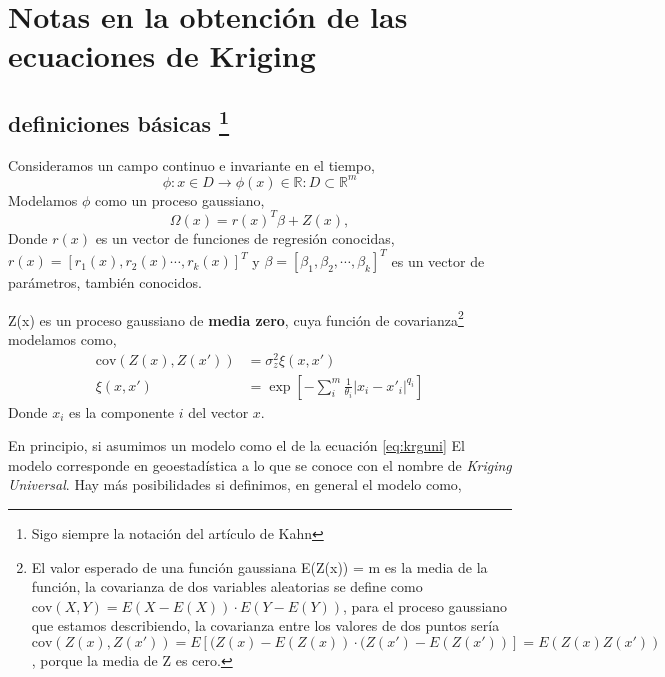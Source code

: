 \documentclass[10pt,a4paper]{report}
\begin{document}
\section{Notas en la obtención de las ecuaciones de Kriging}

\subsection{definiciones básicas \protect\footnote{Sigo siempre la notación del artículo de Kahn}}
Consideramos un campo continuo e invariante en el tiempo,
\begin{equation*}
\phi:x\in D \rightarrow \phi(x) \in \mathbb{R}: D \subset \mathbb{R}^m
\end{equation*}
Modelamos $\phi$ como un proceso gaussiano,
\begin{equation}\label{eq:krguni}
\Omega(x) = r(x)^T\beta+ Z(x),
\end{equation}
Donde $r(x)$ es un vector de funciones de regresión conocidas,\\
$r(x) = [r_1(x),r_2(x)\cdots, r_k(x)]^T$ y $\beta =[\beta_1,\beta_2,\cdots, \beta_k]^T$ es un vector de parámetros, también conocidos.
 
Z(x) es un proceso gaussiano de \textbf{media zero}, cuya función de covarianza\footnote{El valor esperado de una función gaussiana E(Z(x)) = m es la media de la función, la covarianza de dos variables aleatorias se define como $\text{cov}(X,Y) =E(X-E(X))\cdot E(Y-E(Y))$, para el proceso gaussiano que estamos describiendo, la covarianza entre los valores de dos puntos sería $\text{cov}(Z(x),Z(x')) =E[(Z(x)-E(Z(x))\cdot(Z(x')-E(Z(x'))]  = E(Z(x)Z(x'))$, porque la media de Z es cero.}  modelamos como,
\begin{equation}\label{eq:cov}
\begin{split}
\text{cov}(Z(x),Z(x')) &= \sigma_z^2\xi(x,x')\\
\xi(x,x') &= \exp\left[-\sum_i^m\frac{1}{\theta_i}\vert x_i-x'_i\vert ^{q_i}\right]
\end{split}
\end{equation}
Donde $x_i$ es la componente $i$ del vector $x$.

En principio, si asumimos un modelo como el de la ecuación \ref{eq:krguni} El modelo corresponde en geoestadística a lo que se conoce con el nombre de \emph{Kriging Universal}. Hay más posibilidades si definimos, en general el modelo como,
\end{document}
